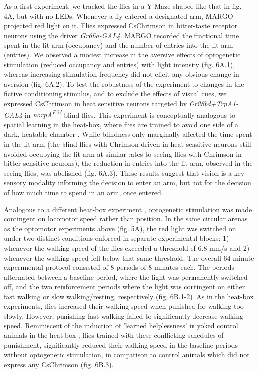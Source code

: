 \documentclass[10pt]{article}
\begin{document}
\begin{multicols}{2}
As a first experiment, we tracked the flies in a Y-Maze shaped like that in fig. 4A, but with no LEDs. Whenever a fly entered a designated arm, MARGO projected red light on it. Flies expressed CsChrimson in bitter-taste receptor neurons using the driver \textit{Gr66a-GAL4}. MARGO recorded the fractional time spent in the lit arm (occupancy) and the number of entries into the lit arm (entries). We observed a modest increase in the aversive effects of optogenetic stimulation (reduced occupancy and entries) with light intensity (fig. 6A.1), whereas increasing stimulation frequency did not elicit any obvious change in aversion (fig. 6A.2). To test the robustness of the experiment to changes in the fictive conditioning stimulus, and to exclude the effects of visual cues, we expressed CsChrimson in heat sensitive neurons targeted by \textit{Gr28bd+TrpA1-GAL4} in \textit{norpA\textsuperscript{P24}} blind flies. This experiment is conceptually analogous to spatial learning in the heat-box, where flies are trained to avoid one side of a dark, heatable chamber \citep{wustmann_rein_wolf_heisenberg_1996,wustmann_heisenberg_1997,diegelmann_2006,ostrowski_kahsai_kramer_knutson_zars_2015,putz_2002,sitaraman_zars_zars_2007,sitaraman_zars_zars_2010,zars_zars_2006}. While blindness only marginally affected the time spent in the lit arm (the blind flies with Chrimson driven in heat-sensitive neurons still avoided occupying the lit arm at similar rates to seeing flies with Chrimson in bitter-sensitive neurons), the reduction in entries into the lit arm, observed in the seeing flies, was abolished (fig. 6A.3). These results suggest that vision is a key sensory modality informing the decision to enter an arm, but not for the decision of how much time to spend in an arm, once entered.

Analogous to a different heat-box experiment \citep{YANG2013799}, optogenetic stimulation was made contingent on locomotor speed rather than position. In the same circular arenas as the optomotor experiments above (fig. 5A), the red light was switched on under two distinct conditions enforced in separate experimental blocks: 1) whenever the walking speed of the flies exceeded a threshold of 6.8 mm/s and 2) whenever the walking speed fell below that same threshold. The overall 64 minute experimental protocol consisted of 8 periods of 8 minutes each. The periods alternated between a baseline period, where the light was permanently switched off, and the two reinforcement periods where the light was contingent on either fast walking or slow walking/resting, respectively (fig. 6B.1-2). As in the heat-box experiments, flies increased their walking speed when punished for walking too slowly. However, punishing fast walking failed to significantly decrease walking speed. Reminiscent of the induction of 'learned helplessness' in yoked control animals in the heat-box \citep{YANG2013799}, flies trained with these conflicting schedules of punishment, significantly reduced their walking speed in the baseline periods without optogenetic stimulation, in comparison to control animals which did not express any CsChrimson (fig. 6B.3).


\end{multicols}
\end{document}
